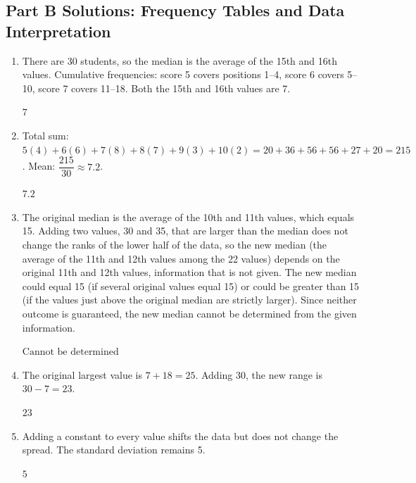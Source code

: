 \documentclass[14pt]{extarticle}
\begin{document}
\subsection*{Part B Solutions: Frequency Tables and Data Interpretation}
\begin{enumerate}
  \item There are 30 students, so the median is the average of the 15th and 16th values. Cumulative frequencies: score 5 covers positions 1--4, score 6 covers 5--10, score 7 covers 11--18. Both the 15th and 16th values are 7.

  \(\boxed{7}\)

  \item Total sum: \(5(4) + 6(6) + 7(8) + 8(7) + 9(3) + 10(2) = 20 + 36 + 56 + 56 + 27 + 20 = 215\). Mean: \(\dfrac{215}{30} \approx 7.2\).

  \(\boxed{7.2}\)

  \item The original median is the average of the 10th and 11th values, which equals 15. Adding two values, 30 and 35, that are larger than the median does not change the ranks of the lower half of the data, so the new median (the average of the 11th and 12th values among the 22 values) depends on the original 11th and 12th values, information that is not given. The new median could equal 15 (if several original values equal 15) or could be greater than 15 (if the values just above the original median are strictly larger). Since neither outcome is guaranteed, the new median cannot be determined from the given information.

  \(\boxed{\text{Cannot be determined}}\)

  \item The original largest value is \(7 + 18 = 25\). Adding 30, the new range is \(30 - 7 = 23\).

  \(\boxed{23}\)

  \item Adding a constant to every value shifts the data but does not change the spread. The standard deviation remains 5.

  \(\boxed{5}\)
\end{enumerate}
\end{document}
